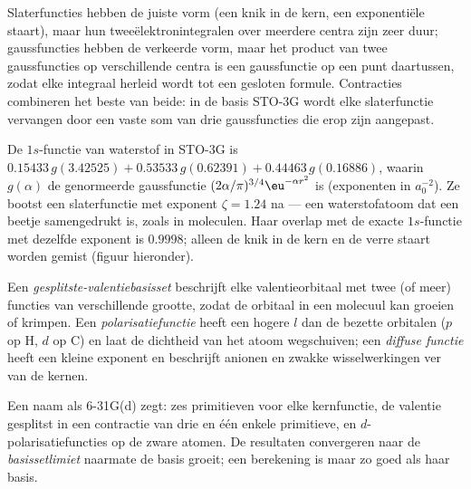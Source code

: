 Slaterfuncties hebben de juiste vorm (een knik in de kern, een
exponentiële staart), maar hun tweeëlektronintegralen over meerdere
centra zijn zeer duur; gaussfuncties hebben de verkeerde vorm, maar het
product van twee gaussfuncties op verschillende centra is een gaussfunctie
op een punt daartussen, zodat elke integraal herleid wordt tot een
gesloten formule. Contracties combineren het beste van beide: in de basis
STO-3G wordt elke slaterfunctie vervangen door een vaste som van drie
gaussfuncties die erop zijn aangepast.

\begin{example}\label{ex:b3:computational-chemistry:sto3g}
De $1s$-functie van waterstof in STO-3G is $0.15433\,g(3.42525) + 0.53533\,
g(0.62391) + 0.44463\,g(0.16886)$, waarin $g(\alpha)$ de genormeerde gaussfunctie
$(2\alpha/\pi)^{3/4}\eu^{-\alpha r^2}$ is (exponenten in $a_0^{-2}$). Ze bootst een
slaterfunctie met exponent $\zeta = 1.24$ na --- een waterstofatoom dat een
beetje samengedrukt is, zoals in moleculen. Haar overlap met de exacte
$1s$-functie met dezelfde exponent is $0.9998$; alleen de knik in de kern
en de verre staart worden gemist (figuur hieronder).
\end{example}

\begin{definition}\label{def:b3:computational-chemistry:split-valence}
Een \emph{gesplitste-valentiebasisset}
beschrijft elke valentieorbitaal met twee (of meer) functies van
verschillende grootte, zodat de orbitaal in een molecuul kan groeien of
krimpen. Een \emph{polarisatiefunctie} heeft een
hogere $l$ dan de bezette
orbitalen ($p$ op H, $d$ op C) en laat de dichtheid van het atoom
wegschuiven; een \emph{diffuse functie} heeft een
kleine exponent en beschrijft anionen en zwakke wisselwerkingen ver van de
kernen.
\end{definition}

Een naam als 6-31G(d) zegt: zes primitieven voor elke kernfunctie, de
valentie gesplitst in een contractie van drie en één enkele primitieve, en
$d$-polarisatiefuncties op de zware atomen. De resultaten convergeren naar
de \emph{basissetlimiet} naarmate de basis groeit; een berekening is maar
zo goed als haar basis.

